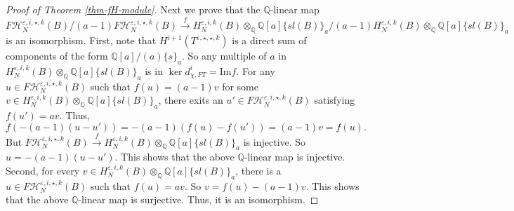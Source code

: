 \documentclass{amsart}
\theoremstyle{plain}
\theoremstyle{definition}
\theoremstyle{remark}
\numberwithin{equation}{section}
\begin{document}
\begin{proof}[Proof of Theorem \ref{thm-fH-module}]
Next we prove that the ${\mathbb{Q}}$-linear map 
\[
F{\mathcal{H}}_N^{{\varepsilon},i,\star,k}(B)/(a-1)F{\mathcal{H}}_N^{{\varepsilon},i,\star,k}(B) \xrightarrow{f} H_N^{{\varepsilon},i,k}(B)\otimes_{\mathbb{Q}} {\mathbb{Q}}[a]\{sl(B)\}_a /(a-1)H_N^{{\varepsilon},i,k}(B)\otimes_{\mathbb{Q}} {\mathbb{Q}}[a]\{sl(B)\}_a
\]
is an isomorphism. First, note that $H^{i+1}(T^{{\varepsilon},\star,\star,k})$ is a direct sum of components of the form ${\mathbb{Q}}[a]/(a)\{s\}_a$. So any multiple of $a$ in $H_N^{{\varepsilon},i,k}(B)\otimes_{\mathbb{Q}} {\mathbb{Q}}[a]\{sl(B)\}_a$ is in $\ker d_{\chi,FT}^{i} = {\mathrm{Im}} f$. For any $u \in F{\mathcal{H}}_N^{{\varepsilon},i,\star,k}(B)$ such that $f(u)=(a-1)v$ for some $v \in H_N^{{\varepsilon},i,k}(B)\otimes_{\mathbb{Q}} {\mathbb{Q}}[a]\{sl(B)\}_a$, there exits an $u'\in F{\mathcal{H}}_N^{{\varepsilon},i,\star,k}(B)$ satisfying $f(u')=av$. Thus, 
\[
f(-(a-1)(u-u')) = -(a-1)(f(u)-f(u')) = (a-1)v = f(u).
\] 
But $F{\mathcal{H}}_N^{{\varepsilon},i,\star,k}(B) \xrightarrow{f} H_N^{{\varepsilon},i,k}(B)\otimes_{\mathbb{Q}} {\mathbb{Q}}[a]\{sl(B)\}_a$ is injective. So $u=-(a-1)(u-u')$. This shows that the above ${\mathbb{Q}}$-linear map is injective. Second, for every $v \in H_N^{{\varepsilon},i,k}(B)\otimes_{\mathbb{Q}} {\mathbb{Q}}[a]\{sl(B)\}_a$, there is a $u \in F{\mathcal{H}}_N^{{\varepsilon},i,\star,k}(B)$ such that $f(u)=av$. So $v=f(u) - (a-1)v$. This shows that the above ${\mathbb{Q}}$-linear map is surjective. Thus, it is an isomorphism. 


\end{proof}
\end{document}
